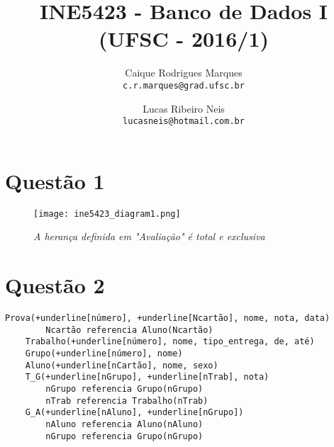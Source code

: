 \documentclass{article}
\title{\textbf{INE5423 - Banco de Dados I (UFSC - 2016/1)}}
\author{
    Caique Rodrigues Marques \\
    {\texttt{c.r.marques@grad.ufsc.br}}
    \and
    Lucas Ribeiro Neis \\
    {\texttt{lucasneis@hotmail.com.br}}
    \vspace{-5mm}
}
\date{}
\begin{document}
\maketitle

\section*{Questão 1}
    \begin{figure*}[h!]
        \centering
        \texttt{[image: ine5423\_diagram1.png]}
        \caption*{\textit{A herança definida em "Avaliação" é total e exclusiva}}
    \end{figure*}
    
\section*{Questão 2}
    \begin{Verbatim}[commandchars=+\[\]]
    Prova(+underline[número], +underline[Ncartão], nome, nota, data)
        Ncartão referencia Aluno(Ncartão)
    Trabalho(+underline[número], nome, tipo_entrega, de, até)
    Grupo(+underline[número], nome)
    Aluno(+underline[nCartão], nome, sexo)
    T_G(+underline[nGrupo], +underline[nTrab], nota)
        nGrupo referencia Grupo(nGrupo)
        nTrab referencia Trabalho(nTrab)
    G_A(+underline[nAluno], +underline[nGrupo])
        nAluno referencia Aluno(nAluno)
        nGrupo referencia Grupo(nGrupo)
    \end{Verbatim}
\end{document}
